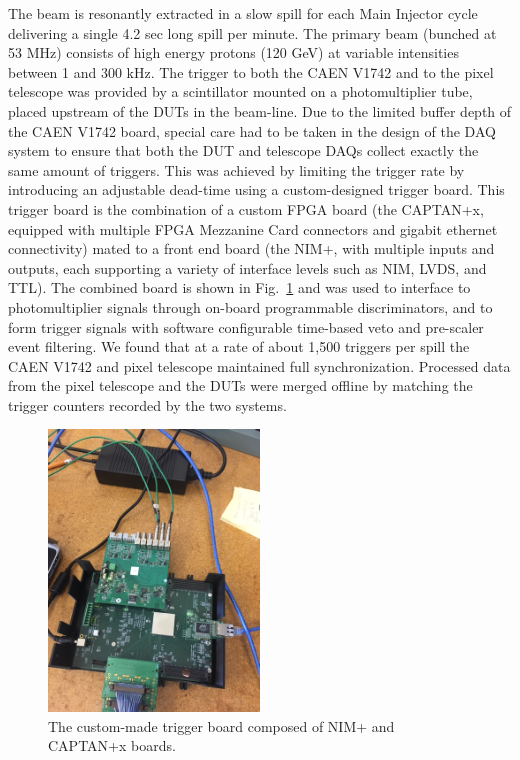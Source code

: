 \documentclass[preprint,1p]{elsarticle}
\begin{document}
The beam is resonantly extracted in a slow spill for each Main Injector cycle
delivering a single 4.2 sec long spill per minute. The primary beam (bunched at
53 MHz) consists of high energy protons (120 GeV) at variable intensities
between 1 and 300 kHz. The trigger to both the CAEN V1742 and to the pixel
telescope was provided by a scintillator mounted on a photomultiplier tube,
placed upstream of the DUTs in the beam-line. Due to the limited buffer depth of
the CAEN V1742 board, special care had to be taken in the design of the DAQ
system to ensure that both the DUT and telescope DAQs collect exactly the same
amount of triggers. This was achieved by limiting the trigger rate by
introducing an adjustable dead-time using a custom-designed trigger board. This
trigger board is the combination of a custom FPGA board (the CAPTAN+x, equipped
with multiple FPGA Mezzanine Card connectors and gigabit ethernet connectivity)
mated to a front end board (the NIM+, with multiple inputs and outputs, each
supporting a variety of interface levels such as NIM, LVDS, and TTL). The
combined board is shown in Fig.~\ref{fig:NIM+Captan} and was used to interface to
photomultiplier signals through on-board programmable discriminators, and to form
trigger signals with software configurable time-based veto and pre-scaler event
filtering. We found that at a rate of about 1,500 triggers per spill the CAEN
V1742 and pixel telescope maintained full synchronization. Processed data
from the pixel telescope and the DUTs were merged offline by matching the
trigger counters recorded by the two systems.

\begin{figure}[htbp] 
\centering
\includegraphics[width=0.5\textwidth, angle=270]{figs/CAPTAN_NIM_Plus.JPG} 
\caption{The custom-made trigger board composed of NIM+ and CAPTAN+x boards.} 
\label{fig:NIM+Captan} 
\end{figure} 
\end{document}
